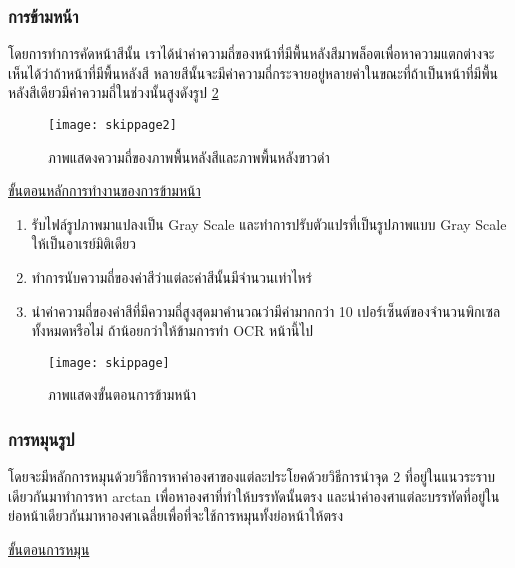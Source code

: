 \subsubsection{การข้ามหน้า}

โดยการทำการคัดหน้าสีนั้น เราได้นำค่าความถี่ของหน้าที่มีพื้นหลังสีมาพล็อตเพื่อหาความแตกต่างจะเห็นได้ว่าถ้าหน้าที่มีพื้นหลังสี หลายสีนั้นจะมีค่าความถี่กระจายอยู่หลายค่าในขณะที่ถ้าเป็นหน้าที่มีพื้นหลังสีเดียวมีค่าความถี่ในช่วงนั้นสูงดังรูป \ref{fig:skippage}

\begin{figure}[H]
    \centering
    \texttt{[image: skippage2]}
    \caption{ภาพแสดงความถี่ของภาพพื้นหลังสีและภาพพื้นหลังขาวดำ}\label{fig:skippage2}
\end{figure}

\underline{ขั้นตอนหลักการทำงานของการข้ามหน้า}

\begin{enumerate}
    \item รับไฟล์รูปภาพมาแปลงเป็น Gray Scale และทำการปรับตัวแปรที่เป็นรูปภาพแบบ Gray Scale ให้เป็นอาเรย์มิติเดียว
    \item ทำการนับความถี่ของค่าสีว่าแต่ละค่าสีนั้นมีจำนวนเท่าไหร่
    \item นำค่าความถี่ของค่าสีที่มีความถี่สูงสุดมาคำนวณว่ามีค่ามากกว่า 10 เปอร์เซ็นต์ของจำนวนพิกเซลทั้งหมดหรือไม่ ถ้าน้อยกว่าให้ข้ามการทำ OCR หน้านี้ไป
\end{enumerate}

\begin{figure}[H]
    \centering
    \texttt{[image: skippage]}
    \caption{ภาพแสดงขั้นตอนการข้ามหน้า}\label{fig:skippage}
\end{figure}

\subsubsection{การหมุนรูป}

โดยจะมีหลักการหมุนด้วยวิธีการหาค่าองศาของแต่ละประโยคด้วยวิธีการนำจุด 2 ที่อยู่ในแนวระราบเดียวกันมาทำการหา arctan เพื่อหาองศาที่ทำให้บรรทัดนั้นตรง และนำค่าองศาแต่ละบรรทัดที่อยู่ในย่อหน้าเดียวกันมาหาองศาเฉลี่ยเพื่อที่จะใช้การหมุนทั้งย่อหน้าให้ตรง

\underline{ขั้นตอนการหมุน}


